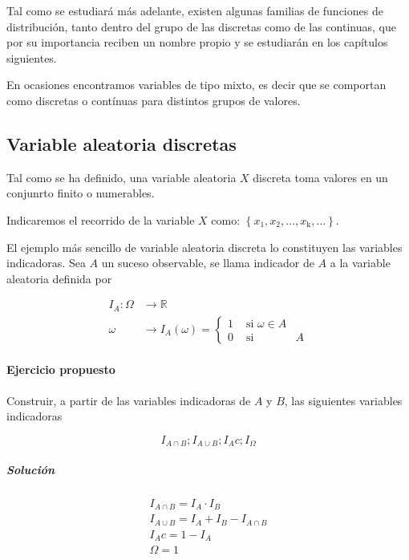 \documentclass[
]{article}
\begin{document}
Tal como se estudiará más adelante, existen algunas familias de
funciones de distribución, tanto dentro del grupo de las discretas como
de las continuas, que por su importancia reciben un nombre propio y se
estudiarán en los capítulos siguientes.

En ocasiones encontramos variables de tipo mixto, es decir que se
comportan como discretas o contínuas para distintos grupos de valores.

\subsection{Variable aleatoria discretas}\label{variable-aleatoria-discretas}

Tal como se ha definido, una variable aleatoria \(X\) discreta toma valores en un conjunrto finito o numerables.

Indicaremos el recorrido de la variable \(X\) como:
\(\left\{x_{1}, x_{2}, \ldots, x_{\mathrm{k}}, \ldots\right\}\).

El ejemplo más sencillo de variable aleatoria discreta lo constituyen
las variables indicadoras. Sea \(A\) un suceso observable, se llama
indicador de \(A\) a la variable aleatoria definida por

\[
\begin{aligned}
I_{A}: \Omega & \rightarrow \mathbb{R} \\
\omega & \rightarrow I_{A}(\omega)=\left\{\begin{array}{lll}
1 & \text { si } \omega \in A \\
0 & \text { si } & A
\end{array}\right.
\end{aligned}
\]

\paragraph{Ejercicio propuesto}\label{ejercicio-propuesto}

Construir, a partir de las variables indicadoras de \(A\) y \(B\), las
siguientes variables indicadoras

\[
I_{A \cap B} ; I_{A \cup B} ; I_{A} c ; I_{\Omega}
\]

\subparagraph{Solución}\label{soluciuxf3n}

\[
\begin{gathered}
I_{A \cap B}=I_{A} \cdot I_{B} \\
I_{A \cup B}=I_{A}+I_{B}-I_{A \cap B} \\
I_{A} c=1-I_{A} \\
\Omega=1
\end{gathered}
\]
\end{document}
